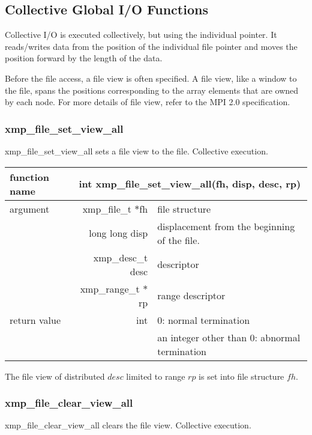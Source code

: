    \subsection{Collective Global I/O Functions}

   Collective I/O is executed collectively, but using the individual pointer.
   It reads/writes data from the position of the individual file pointer
   and moves the position forward by the length of the data.

   Before the file access, a file view is often specified. A file view, like a window to the file, 
   spans the positions corresponding to the array elements that are
   owned by each node. 
   For more details of file view, refer to the MPI 2.0 specification.

   \subsubsection{xmp\_file\_set\_view\_all}
   xmp\_file\_set\_view\_all sets a file view to the file. Collective execution.

   \begin{table}[h]
    \begin{center}
     \begin{tabular}{|l|r|p{70mm}|}
      \hline
      {\bf function name}  & \multicolumn{2}{c|}{\bf int xmp\_file\_set\_view\_all(fh,
      disp, desc, rp)} \\ \hline \hline
      argument & xmp\_file\_t $*$fh & file structure \\ \cline{2-3}
      & long long disp & displacement from the beginning of the file. \\ \cline{2-3}
      & xmp\_desc\_t desc & descriptor \\ \cline{2-3}
      & xmp\_range\_t $*$rp & range descriptor \\ \hline
      return value & int & 0: normal termination \\
      &  & an integer other than 0: abnormal termination \\ \hline
      \end{tabular}
     \end{center}
   \end{table}

   The file view of distributed $desc$ limited to range $rp$ is set into file structure $fh$.

   \subsubsection{xmp\_file\_clear\_view\_all}
   xmp\_file\_clear\_view\_all clears the file view. Collective execution.

